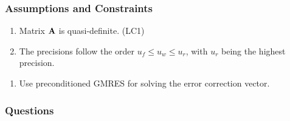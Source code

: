 \documentclass[t,12pt,numbers,fleqn]{beamer}
\begin{document}
\begin{frame}
\frametitle{Assumptions and Constraints}

\begin{enumerate}[{A}1]
\item Matrix \(\mathbf{A}\) is quasi-definite. (LC1)
\item The precisions follow the order \(u_f \leq u_w \leq u_r\), with \(u_r\) being the
  highest precision.
\end{enumerate}

\begin{enumerate}[{C}1]
\item Use preconditioned GMRES for solving the error correction vector.
\end{enumerate}

\end{frame}


\begin{frame}
\frametitle{Questions}

\end{frame}

\end{document}
